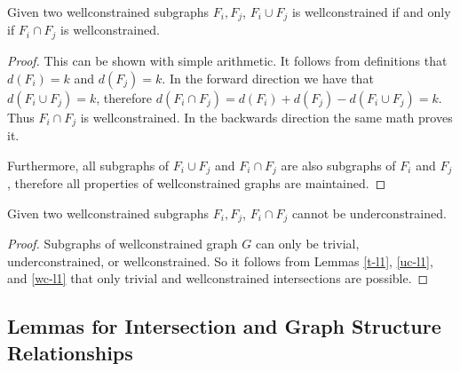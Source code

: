 \documentclass[11pt]{article}
\begin{document}
\begin{lemma}\label{wc-l1}
Given two wellconstrained subgraphs $F_i,F_j$, $F_i\cup F_j$ is wellconstrained if and only if $F_i\cap F_j$ is wellconstrained.
\end{lemma}

\begin{proof}
This can be shown with simple arithmetic. It follows from definitions that $d(F_i)=k$ and $d(F_j)=k$. In the forward direction we have that $d(F_i\cup F_j)=k$, therefore $d(F_i\cap F_j)=d(F_i)+d(F_j)-d(F_i\cup F_j)=k$. Thus $F_i\cap F_j$ is wellconstrained. In the backwards direction the same math proves it.

Furthermore, all subgraphs of $F_i\cup F_j$ and $F_i\cap F_j$ are also subgraphs of $F_i$ and $F_j$, therefore all properties of wellconstrained graphs are maintained.


\end{proof}


\begin{lemma}\label{iuc-l1}
Given two wellconstrained subgraphs $F_i,F_j$, $F_i\cap F_j$ cannot be underconstrained.
\end{lemma}

\begin{proof}
Subgraphs of wellconstrained graph $G$ can only be trivial, underconstrained, or wellconstrained. So it follows from Lemmas \ref{t-l1}, \ref{uc-l1}, and \ref{wc-l1} that only trivial and wellconstrained intersections are possible.
\end{proof}






\subsection{Lemmas for Intersection and Graph Structure Relationships}
\end{document}
